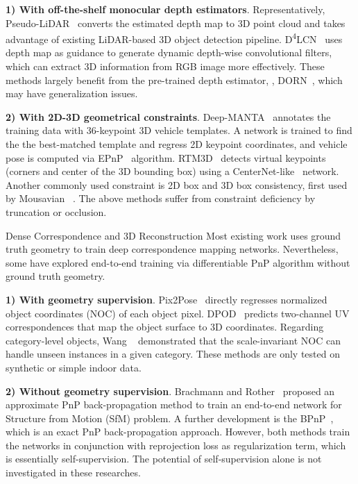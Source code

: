 \documentclass[10pt,twocolumn,letterpaper]{article}
\makeatletter
\renewcommand{\paragraph}{
  \@startsection{paragraph}{4}
  {\z@}{0.7ex \@plus .2ex \@minus .1ex}{-1em}
  {\normalfont\normalsize\bfseries}
}
\makeatother
\begin{document}
\textbf{1) With off-the-shelf monocular depth estimators}. Representatively, Pseudo-LiDAR~\cite{Pseudo-LiDAR} converts the estimated depth map to 3D point cloud and takes advantage of existing LiDAR-based 3D object detection pipeline.
D\textsuperscript{4}LCN~\cite{D4LCN} uses depth map as guidance to generate dynamic depth-wise convolutional filters, which can extract 3D information from RGB image more effectively. These methods largely benefit from the pre-trained depth estimator, \eg, DORN~\cite{DORN}, which may have generalization issues.

\textbf{2) With 2D-3D geometrical constraints}. Deep-MANTA~\cite{deep-manta} annotates the training data with 36-keypoint 3D vehicle templates. 
A network is trained to find the the best-matched template and regress 2D keypoint coordinates, and vehicle pose is computed via EPnP~\cite{EPnP} algorithm. 
RTM3D~\cite{RTM3D} detects virtual keypoints (corners and center of the 3D bounding box) using a CenterNet-like~\cite{centernet} network. 
Another commonly used constraint is 2D box and 3D box consistency, 
first used by Mousavian \etal~\cite{3dbbox}. The above methods suffer from constraint deficiency by truncation or occlusion.

\paragraph{Dense Correspondence and 3D Reconstruction} Most existing work uses ground truth geometry to train deep correspondence mapping networks. Nevertheless, some have explored end-to-end training via differentiable PnP algorithm without ground truth geometry.

\textbf{1) With geometry supervision}. Pix2Pose~\cite{pix2pose} directly regresses normalized object coordinates (NOC) of each object pixel.
DPOD~\cite{DPOD} predicts two-channel UV correspondences that map the object surface to 3D coordinates. Regarding category-level objects, Wang \etal~\cite{NOCS} demonstrated that the scale-invariant NOC can handle unseen instances in a given category. 
These methods are only tested on synthetic or simple indoor data.

\textbf{2) Without geometry supervision}. Brachmann and Rother~\cite{dsac++} proposed an approximate PnP back-propagation method to train an end-to-end network for Structure from Motion (SfM) problem.
A further development is the BPnP~\cite{BPnP}, which is an exact PnP back-propagation approach. However, both methods train the networks in conjunction with reprojection loss as regularization term, which is essentially self-supervision. The potential of self-supervision alone is not investigated in these researches.
\end{document}
